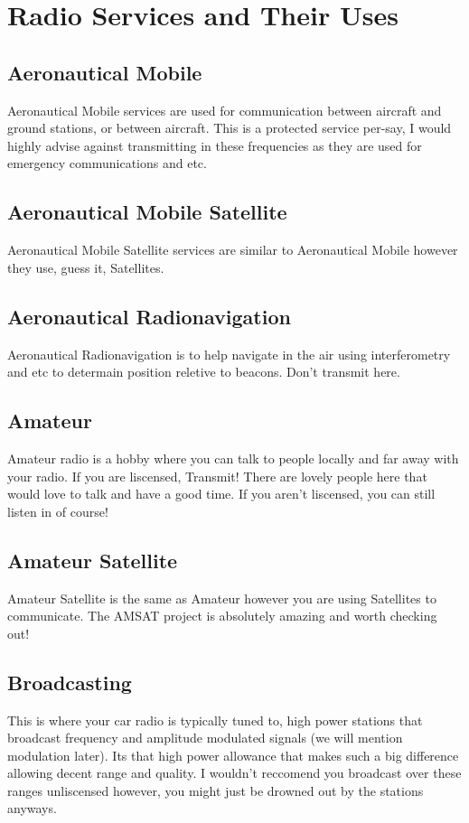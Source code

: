 \documentclass{book}
\begin{document}
    \chapter{Radio Services and Their Uses}
    \section{Aeronautical Mobile}
        Aeronautical Mobile services are used for communication between aircraft and ground stations, or between aircraft.
        This is a protected service per-say, I would highly advise against transmitting in these frequencies 
        as they are used for emergency communications and etc.
    \section{Aeronautical Mobile Satellite}
        Aeronautical Mobile Satellite services are similar to Aeronautical Mobile however they use, guess it, Satellites.
    \section{Aeronautical Radionavigation}
        Aeronautical Radionavigation is to help navigate in the air using interferometry and etc to determain position reletive 
        to beacons. Don't transmit here.
    \section{Amateur}
        Amateur radio is a hobby where you can talk to people locally and far away with your radio.
        If you are liscensed, Transmit! There are lovely people here that would love
        to talk and have a good time. If you aren't liscensed, you can still listen in of course!
    \section{Amateur Satellite}
        Amateur Satellite is the same as Amateur however you are using Satellites to communicate. The AMSAT project is absolutely amazing and worth checking out!
    \section{Broadcasting}
        This is where your car radio is typically tuned to, high power stations that broadcast frequency and amplitude modulated signals (we will mention modulation later).
        Its that high power allowance that makes such a big difference allowing decent range and quality. I wouldn't reccomend you broadcast over these ranges unliscensed however, you might just 
        be drowned out by the stations anyways. 
\end{document}
